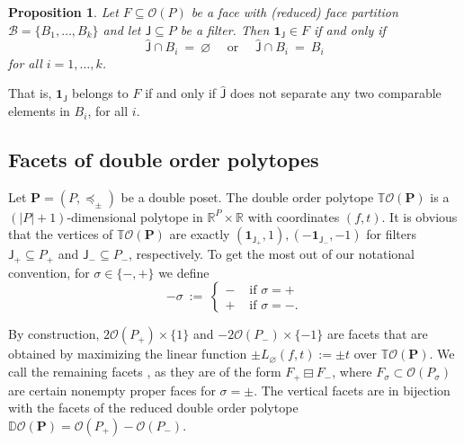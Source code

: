 \documentclass[11pt]{amsart}
\newtheorem{prop}[thm]{Proposition}
\theoremstyle{definition}
\begin{document}
\begin{prop}\label{prop:filter_fapa}
    Let $F \subseteq {\mathcal{O}({P})}$ be a face with (reduced) face partition ${\mathcal{B}}
    = \{B_1,\dots,B_k\}$ and let  ${\mathsf{J}}\subseteq {P}$ be a filter. Then
    ${\mathbf{1}}_{\mathsf{J}}\in F$ if and only if
    \[
    \widehat{\mathsf{J}} \cap B_i \ = \ {\varnothing} \quad \text{ or } \quad
    \widehat{\mathsf{J}} \cap B_i \ = \ B_i
    \]
    for all $i=1,\dots,k$.
\end{prop}
That is, ${\mathbf{1}}_{\mathsf{J}}$ belongs to $F$ if and only if $\widehat{\mathsf{J}}$ does not separate
any two comparable elements in $B_i$, for all $i$. 

\subsection{Facets of double order polytopes} \label{ssec:TO_facets}
Let ${\mathbf{P}} = ({P},\preceq_\pm)$ be a double poset. The double order polytope
${{\mathbb{T}}{\mathcal{O}({\mathbf{P}})}}$ is a $(|{P}|+1)$-dimensional polytope in ${\mathbb{R}}^{P} \times
{\mathbb{R}}$ with coordinates $(f,t)$.  It is obvious that the vertices of
${{\mathbb{T}}{\mathcal{O}({\mathbf{P}})}}$ are exactly $({\mathbf{1}}_{{\mathsf{J}}_+},1), (-{\mathbf{1}}_{{\mathsf{J}}_-},-1)$
for filters ${\mathsf{J}}_+ \subseteq {P}_+$ and ${\mathsf{J}}_- \subseteq {P}_-$,
respectively.  To get the most out of our notational convention, for
$\sigma \in \{-,+\}$ we define
\[
    -\sigma \ := \
    \begin{cases}
        - & \text{ if } \sigma = +\\
        + & \text{ if } \sigma = -.
    \end{cases}
\]

By construction, $2{\mathcal{O}({{P}_+})} \times \{1\}$ and $-2{\mathcal{O}({{P}_-})} \times \{-1\}$
are facets that are obtained by maximizing the linear function $\pm
L_{\varnothing}(f,t) := \pm t$ over ${{\mathbb{T}}{\mathcal{O}({\mathbf{P}})}}$. We call the remaining facets
{\textbf{\color{black}{vertical}}}, as they are of the form ${{{F_+} \boxminus {F_-}}}$, where $F_\sigma
\subset {\mathcal{O}({{P}_\sigma})}$ are certain nonempty proper faces for $\sigma = \pm$.
The vertical facets are in bijection with the facets of the reduced double
order polytope ${\mathbb{D}{\mathcal{O}({\mathbf{P}})}} = {\mathcal{O}({{P}_+})} - {\mathcal{O}({{P}_-})}$.
\end{document}
